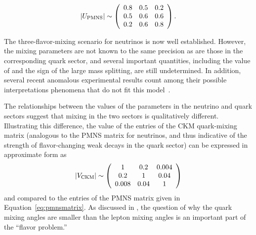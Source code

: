 \begin{equation}
|U_{\rm PMNS}|\sim \left(\begin{array}{ccc} 0.8 & 0.5 & 0.2 \\ 0.5 & 0.6 & 0.6 \\ 0.2 & 0.6 & 0.8\end{array} \right).
\label{eq:pmnsmatrix}
\end{equation}


The three-flavor-mixing scenario for neutrinos is now well
established. However, the mixing parameters are not known to the same precision 
as are those in the
corresponding quark sector, and several important quantities, including
the value of \deltacp and the sign of the large mass splitting, are
still undetermined. In addition, several recent
anomalous experimental results count among their possible
interpretations phenomena that do not fit this 
model~\cite{Aguilar:2001ty,AguilarArevalo:2007it,Aguilar-Arevalo:2013pmq,Mention:2011rk}.

The relationships between the values of the parameters in the neutrino
and quark sectors suggest that mixing in the two sectors is
qualitatively different. Illustrating this difference, the value of
the entries of the CKM quark-mixing matrix (analogous to the PMNS matrix for
neutrinos, and thus indicative of the strength of flavor-changing weak
decays in the quark sector) can be expressed in approximate form as
\begin{equation}
|V_{\rm CKM}|\sim \left(\begin{array}{ccc} 1 & 0.2 & 0.004\\ 0.2 & 1 & 0.04 \\ 0.008 & 0.04 & 1\end{array} \right)
\label{eq:ckmmatrix}
\end{equation}
and compared to the entries of the PMNS matrix given in Equation~\ref{eq:pmnsmatrix}.
As discussed in \cite{King:2014nza}, the question of why the quark mixing angles are
smaller than the lepton mixing angles is an important part of the ``flavor problem.''

